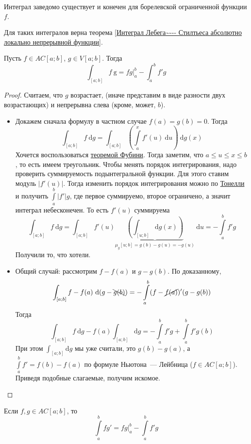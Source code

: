 \documentclass{article}
\begin{document}
    \begin{property}
        Интеграл заведомо существует и конечен для борелевской ограниченной функции $f$.
    \end{property}
    \begin{property}
        Для таких интегралов верна теорема \ref{Интеграл Лебега~--- Стилтьеса абсолютно локально непрерывной функции}.
    \end{property}
    \begin{theorem}
        \label{Интегрирование по частям в интеграле Лебега~--- Стилтьеса}
        Пусть $f\in AC[a;b]$, $g\in V[a;b]$. Тогда
        $$
        \int_{[a;b]} f~\mathrm g=fg\bigg|_a^b-\int_a^bf'g
        $$
    \end{theorem}
    \begin{proof}
        Считаем, что $g$ возрастает, (иначе представим в виде разности двух возрастающих) и непрерывна слева (кроме, может, $b$).
        \begin{itemize}
            \item Докажем сначала формулу в частном случае $f(a)=g(b)=0$. Тогда
            $$
            \int_{[a;b]}f~\mathrm dg=\int_{[a;b]}\left(\int\limits_a^xf'(u)~\mathrm du\right)~\mathrm dg(x)
            $$
            Хочется воспользоваться \hyperref[Теорема Фубини]{теоремой Фубини}. Тогда заметим, что $a\leqslant u\leqslant x\leqslant b$, то есть имеем треугольник. Чтобы менять порядок интегрирования, надо проверить суммируемость подынтегральной функции. Для этого ставим модуль $|f'(u)|$. Тогда изменить порядок интегрирования можно по \hyperref[Теорема Тонелли]{Тонелли} и получить $\int\limits_a^b|f'|g$, где первое суммируемо, второе ограничено, а значит интеграл небесконечен. То есть $f'(u)$ суммируема
            $$
            \int_{[a;b]}f~\mathrm dg=\int_{[a;b]}f'(u)\underbrace{\left(\int_{[u;b]}\mathrm dg(x)\right)}_{\mu_g[u;b]=g(b)-g(u)=-g(u)}~\mathrm du=-\int\limits_a^bf'g
            $$
            Получили то, что хотели.
            \item Общий случай: рассмотрим $f-f(a)$ и $g-g(b)$. По доказанному,
            $$
            \int_{[a;b]}f-f(a)~\mathrm d(g-\bcancel{g(b)})=-\int\limits_a^b(f-\cancel{f(a)})'(g-g(b))
            $$
            Тогда
            $$
            \int_{[a;b]}f~\mathrm dg-f(a)\int_{[a;b]}\mathrm dg=-\int\limits_a^bf'g+\int\limits_a^bf'g(b)
            $$
            При этом $\int_{[a;b]}\mathrm dg$ мы уже считали, это $g(b)-g(a)$, а $\int\limits_a^bf'=f(b)-f(a)$ по формуле Ньютона~--- Лейбница ($f\in AC[a;b]$). Приведя подобные слагаемые, получим искомое.
        \end{itemize}
    \end{proof}
    \begin{corollary}
        \label{Интегрирование по частям в интеграле Лебега}
        Если $f,g\in AC[a;b]$, то
        $$
        \int\limits_a^bfg'=fg\bigg|_a^b-\int\limits_a^bf'g
        $$
    \end{corollary}
\end{document}
